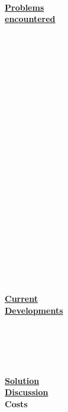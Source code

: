 \documentclass[12pt,a4paper]{article}
\begin{document}
\begin{parcolumns}[colwidths={1=2.5 cm, 2=10 cm, 3=2.5cm}]{3}
{			\\\\\\\\\\\\ \\ \\\\ \\ \\ \underline{\textbf{Problems}}\\ \underline{\textbf{encountered}} \\ \\ \\ \\ \\ \\ \\ \\ \\ \\ \\ \\ \\\\ \\\ \\ \\ \\ \ \\ \\ \\ \\ \\ \\ \underline{\textbf{Current}}\\ \underline{\textbf{Developments}}\\\\ \\ \\ \\ \\  \underline{\textbf{Solution}}\\ \underline{\textbf{Discussion}}\\ \textbf{Costs}
}
\end{parcolumns}
\end{document}
